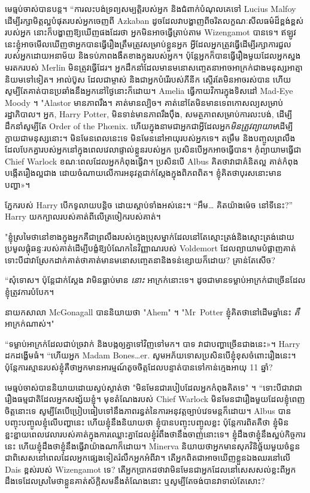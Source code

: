 មេធ្មប់ចាស់បានបន្ត។ “ការលះបង់ទ្រព្យសម្បត្តិរបស់អ្នក និងជំពាក់បំណុលគេទៅ Lucius Malfoy ដើម្បីរក្សាមិត្តល្អបំផុតរបស់អ្នកចេញពី Azkaban ដូចដែលវាបង្ហាញពីចរិតលក្ខណៈសីលធម៌ដ៏ខ្ពង់ខ្ពស់របស់អ្នក នោះក៏បង្ហាញឱ្យឃើញផងដែរថា អ្នកមិនអាចធ្វើត្រាប់តាម Wizengamot បានទេ។ ឥឡូវនេះខ្ញុំអាចមើលឃើញថាអ្នកបានធ្វើរឿងត្រឹមត្រូវសម្រាប់ខ្លួនអ្នក អ្វីដែលអ្នកត្រូវធ្វើដើម្បីរក្សាការជួលរបស់អ្នកដោយអនាម័យ និងទប់ភាពងងឹតខាងក្នុងរបស់អ្នក។ ប៉ុន្តែអ្នកក៏បានធ្វើរឿងមួយដែលអ្នកស្នងមរតករបស់ Merlin មិនត្រូវធ្វើដែរ។ អ្នកដឹកនាំដែលមានមនោសញ្ចេតនាអាចអាក្រក់ជាងមនុស្សអាត្មានិយមទៅទៀត។ អាល់ប៊ូស ដែលជាម្ចាស់ និងជាអ្នកបំរើរបស់ភីនីក ស្ទើរតែមិនអាចរស់បាន ហើយសូម្បីតែគាត់បានប្រឆាំងនឹងអ្នកនៅថ្ងៃនោះក៏ដោយ។ Amelia ធ្វើកាយវិការក្នុងទិសដៅ Mad-Eye Moody ។ "Alastor មានភាពរឹង។ គាត់មានល្បិច។ គាត់​នៅ​តែ​មិន​មាន​ទេពកោសល្យ​សម្រាប់​រដ្ឋាភិបាល។ អ្នក, Harry Potter, មិន​ទាន់​មាន​ភាព​រឹង​ប៉ឹង, សមត្ថភាព​សម្រាប់​ការ​លះបង់, ដើម្បី​ដឹកនាំ​សូម្បី​តែ Order of the Phœnix. ហើយក្នុងនាមជាអ្នកជាអ្វីដែលអ្នក\emph{មិនត្រូវព្យាយាម}ដើម្បីក្លាយជាមនុស្សនោះ។ មិនមែនពេលនេះទេ មិនមែននៅអាយុរបស់អ្នកទេ។ តម្រឹម និងបញ្ចូលព្រលឹងដែលបែកគ្នារបស់អ្នកនៅក្នុងពេលវេលាផ្ទាល់ខ្លួនរបស់អ្នក ប្រសិនបើអ្នកអាចធ្វើបាន។ កុំព្យាយាមធ្វើជា Chief Warlock ខណៈពេលដែលអ្នកកំពុងធ្វើវា។ ប្រសិនបើ Albus គិតថាវាជាគំនិតល្អ គាត់កំពុងបង្កើតរឿងល្អជាង ដោយចំណាយលើការអនុវត្តជាក់ស្តែងក្នុងពិភពពិត។ ខ្ញុំ​គិត​ថា​បុរស​នោះ​មាន​បញ្ហា»។

ភ្នែករបស់ Harry បើកទូលាយបន្តិច ដោយស្តាប់ទាំងអស់នេះ។ “អឹម… គិតយ៉ាងម៉េច នៅទីនេះ?” Harry យកក្បាលរបស់គាត់ពីលើត្រចៀករបស់គាត់។

"ខ្ញុំស្រមៃថានៅខាងក្នុងអ្នកគឺជាព្រលឹងរបស់ក្មេងប្រុសម្នាក់ដែលនៅតែស្មោះត្រង់និងស្មោះត្រង់ដោយប្រមូលផ្តុំឆន្ទៈរបស់គាត់ដើម្បីបង្ខំឱ្យបំណែកនៃវិញ្ញាណរបស់ Voldemort ដែលព្យាយាមបំផ្លាញគាត់ទោះបីជាវាស្រែកដាក់គាត់ថាគាត់មានមនោសញ្ចេតនានិងទន់ខ្សោយក៏ដោយ? គ្រាន់តែសើច?

“សុំទោស។ ប៉ុន្តែជាក់ស្តែង វាមិនធ្លាប់មាន \emph{នោះ} អាក្រក់នោះទេ។ ដូច​ជា​មាន​ទម្លាប់​អាក្រក់​ជា​ច្រើន​ដែល​ខ្ញុំ​ត្រូវ​ការ​បំបែក។

នាយកសាលា McGonagall បាននិយាយថា "Ahem" ។ "Mr~Potter ខ្ញុំគិតថានៅដើមឆ្នាំនេះ \emph{គឺ}អាក្រក់ណាស់។"

“ទម្លាប់អាក្រក់ដែលជាប់ច្រវាក់ និងបង្កឲ្យគ្នាទៅវិញទៅមក។ បាទ វា​ជា​បញ្ហា​ច្រើន​ជាង​នេះ»។ Harry ដកដង្ហើមធំ។ “ហើយអ្នក Madam Bones…er. សូមអភ័យទោសប្រសិនបើខ្ញុំខុសចំពោះរឿងនេះ។ ប៉ុន្តែ​ការ​ស្មាន​របស់​ខ្ញុំ​គឺ​ថា​អ្នក​មាន​អារម្មណ៍​តូច​ចិត្ត​ដែល​បន្ទាត់​បាន​ទៅ​កាន់​ក្មេង​អាយុ 11 ឆ្នាំ​?

មេធ្មប់ចាស់បាននិយាយដោយស្ងប់ស្ងាត់ថា "មិនមែនជារបៀបដែលអ្នកកំពុងគិតទេ" ។ “ទោះ​បី​ជា​វា​ជា​រឿង​ធម្ម​ជាតិ​ដែល​អ្នក​សង្ស័យ​ខ្ញុំ។ មុខតំណែងរបស់ Chief Warlock មិនមែនជារឿងមួយដែលខ្ញុំពេញចិត្តនោះទេ សូម្បីតែបើប្រៀបធៀបទៅនឹងភាពរន្ធត់នៃការអនុវត្តច្បាប់វេទមន្តក៏ដោយ។ Albus បានបញ្ចុះបញ្ចូលខ្ញុំលើបញ្ហានេះ ហើយខ្ញុំនឹងនិយាយថា ខ្ញុំបានបញ្ចុះបញ្ចូលខ្លះ ប៉ុន្តែការពិតគឺថា ខ្ញុំមិនខ្ជះខ្ជាយពេលវេលារបស់គាត់ក្នុងការឈ្លោះគ្នាដែលខ្ញុំរំពឹងថានឹងចាញ់នោះទេ។ ខ្ញុំដឹងថាខ្ញុំនឹងស្អប់កិច្ចការនេះ ហើយខ្ញុំដឹងថាខ្ញុំនឹងធ្វើវាយ៉ាងណាក៏ដោយ។ Minerva និយាយថាអ្នកមានសុភវិនិច្ឆ័យមួយចំនួន ជាពិសេសនៅពេលដែលអ្នកផ្សេងទៀតរំលឹកអ្នកអំពីវា។ តើអ្នកពិតជាអាចឃើញខ្លួនឯងឈរនៅលើ Dais ខ្ពស់របស់ Wizengamot ទេ? តើ​អ្នក​ប្រាកដ​ថា​វា​មិន​មែន​ជា​អ្នក​ដែល​នៅ​សេសសល់​ខ្លះ​ពី​អ្នក​ដឹង​ទេ​ដែល​ស្រមៃ​ថា​ខ្លួន​គាត់​ស័ក្តិសម​នឹង​តំណែង​នោះ ឬ​សូម្បី​តែ​ចង់​បាន​វា​ទាល់​តែ​សោះ?

